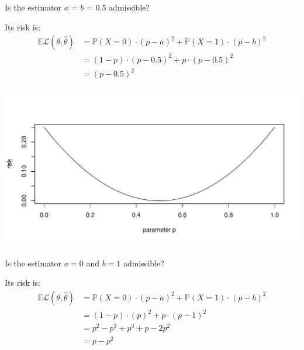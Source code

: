 \begin{frame}[fragile] \frametitle{}

Is the estimator $a$ = $b$ = $0.5$ admissible?

\pause Its risk is:
\begin{align*}
\mathbb{E} \mathcal{L} (\theta, \widehat{\theta})
&= \mathbb{P}(X = 0) \cdot (p - a)^2 + \mathbb{P}(X = 1) \cdot (p - b)^2 \\
&= (1-p) \cdot (p - 0.5)^2 + p \cdot (p - 0.5)^2 \\
&= (p - 0.5)^2
\end{align*}

\end{frame}

\begin{frame}[fragile] \frametitle{}

\begin{center}
\includegraphics[width=\textwidth]{img/fig01.pdf}
\end{center}

\end{frame}

\begin{frame}[fragile] \frametitle{}

Is the estimator $a = 0$ and $b = 1$ admissible?

\pause Its risk is:
\begin{align*}
\mathbb{E} \mathcal{L} (\theta, \widehat{\theta})
&= \mathbb{P}(X = 0) \cdot (p - a)^2 + \mathbb{P}(X = 1) \cdot (p - b)^2 \\
&= (1-p) \cdot (p)^2 + p \cdot (p - 1)^2 \\
&= p^2 - p^3 + p^3 + p - 2 p^2 \\
&= p - p^2
\end{align*}

\end{frame}

